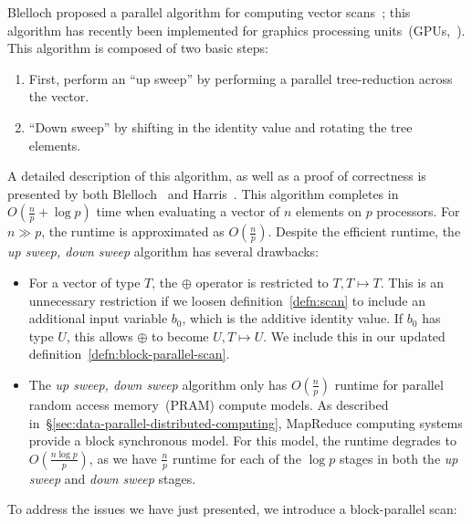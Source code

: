 \documentclass[preprint]{sigplanconf}
\theoremstyle{definition}
\begin{document}
Blelloch proposed a parallel algorithm for computing vector scans~\cite{blelloch93}; this algorithm has
recently been implemented for graphics processing units~(GPUs,~\cite{harris07}). This algorithm is
composed of two basic steps:

\begin{enumerate}
\item First, perform an ``up sweep'' by performing a parallel tree-reduction across the vector.
\item ``Down sweep'' by shifting in the identity value and rotating the tree elements.
\end{enumerate}

A detailed description of this algorithm, as well as a proof of correctness is presented by both
Blelloch~\cite{blelloch93} and Harris~\cite{harris07}. This algorithm completes in $O(\frac{n}{p} +
\log p)$ time when evaluating a vector of $n$ elements on $p$ processors. For $n \gg p$, the
runtime is approximated as $O(\frac{n}{p})$. Despite the efficient runtime, the \emph{up sweep,
down sweep} algorithm has several drawbacks:

\begin{itemize}
\item For a vector of type $T$, the $\oplus$ operator is restricted to $T, T \mapsto T$. This is an
unnecessary restriction if we loosen definition~\ref{defn:scan} to include an additional input variable
$b_0$, which is the additive identity value. If $b_0$ has type $U$, this allows $\oplus$ to become $U, T
\mapsto U$. We include this in our updated definition~\ref{defn:block-parallel-scan}.
\item The \emph{up sweep, down sweep} algorithm only has $O(\frac{n}{p})$ runtime for parallel
random access memory~(PRAM) compute models. As described
in~\S\ref{sec:data-parallel-distributed-computing}, MapReduce computing systems provide a block
synchronous model. For this model, the runtime degrades to $O(\frac{n \log p}{p})$, as we have
$\frac{n}{p}$ runtime for each of the $\log p$ stages in both the \emph{up sweep} and \emph{down
sweep} stages.
\end{itemize}

To address the issues we have just presented, we introduce a block-parallel scan:
\end{document}

